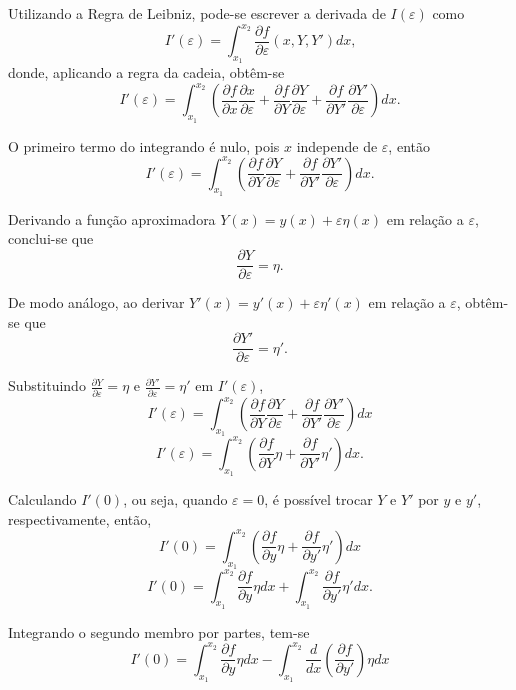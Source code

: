 \documentclass{beamer}
\begin{document}
\begin{frame}
	\justify
	
	Utilizando a Regra de Leibniz, pode-se escrever a derivada de $I(\varepsilon)$ como
	$$I'(\varepsilon)=\int_{x_1}^{x_2} \frac{\partial f}{\partial \varepsilon} (x, Y, Y') dx \text{,}$$
	\pause
	donde, aplicando a regra da cadeia, obtêm-se
	$$I'(\varepsilon)=\int_{x_1}^{x_2}\left ( \frac{\partial f}{\partial x}\frac{\partial x}{\partial \varepsilon} + \frac{\partial f}{\partial Y} \frac{\partial Y}{\partial \varepsilon} + \frac{\partial f}{\partial Y'} \frac{\partial Y'}{\partial \varepsilon} \right )dx\text{.}$$
	\pause
	
	O primeiro termo do integrando é nulo, pois $x$ independe de $\varepsilon$, então
	$$
		I'(\varepsilon)=\int_{x_1}^{x_2}\left ( \frac{\partial f}{\partial Y}\frac{\partial Y}{\partial \varepsilon} + \frac{\partial f}{\partial Y'}\frac{\partial Y'}{\partial \varepsilon} \right ) dx \text{.}
	$$
\end{frame}

\begin{frame}
	\justify
	
	Derivando a função aproximadora $Y(x)=y(x)+\varepsilon \eta(x)$ em relação a $\varepsilon$, conclui-se que
	$$\frac{\partial Y}{\partial \varepsilon}=\eta\text{.}$$
	\pause
	
	De modo análogo, ao derivar $Y'(x)=y'(x)+\varepsilon \eta '(x)$ em relação a $\varepsilon$, obtêm-se que
	$$\frac{\partial Y'}{\partial \varepsilon}=\eta '\text{.}$$
\end{frame}

\begin{frame}
	\justify
	
	Substituindo $\frac{\partial Y}{\partial \varepsilon}=\eta$ e $\frac{\partial Y'}{\partial \varepsilon}=\eta'$ em $I'(\varepsilon)$,
	$$
		I'(\varepsilon)=\int_{x_1}^{x_2}\left ( \frac{\partial f}{\partial Y}\frac{\partial Y}{\partial \varepsilon} + \frac{\partial f}{\partial Y'}\frac{\partial Y'}{\partial \varepsilon} \right ) dx
	$$
	\pause
	$$
		I'(\varepsilon)=\int_{x_1}^{x_2}\left ( 
			\frac{\partial f}{\partial Y} \eta +
			\frac{\partial f}{\partial Y'} \eta '
		\right )dx \text{.}
	$$
\end{frame}

\begin{frame}
	\justify
	
	Calculando $I'(0)$, ou seja, quando $\varepsilon=0$, é possível trocar $Y$ e $Y'$ por $y$ e $y'$, respectivamente, então,
	$$
		I'(0)=\int_{x_1}^{x_2}\left (
			\frac{\partial f}{\partial y} \eta +
			\frac{\partial f}{\partial y'} \eta '
		\right )dx
	$$
	\pause
	$$
		I'(0)=
			\int_{x_1}^{x_2} \frac{\partial f}{\partial y}\eta dx
			+
			\int_{x_1}^{x_2} \frac{\partial f}{\partial y'}\eta' dx \text{.}
	$$
	\pause
	
	Integrando o segundo membro por partes, tem-se
	$$
	I'(0)=
		\int_{x_1}^{x_2} \frac{\partial f}{\partial y}\eta dx
		-
		\int_{x_1}^{x_2} \frac{d}{dx} \left ( \frac{\partial f}{\partial y'} \right ) \eta dx
	$$
\end{frame}
\end{document}
